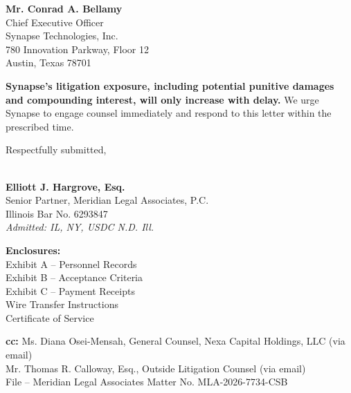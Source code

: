 \documentclass[
  paper=letter,
  fontsize=10.5pt,
  parskip=half,
  firsthead=true,
  fromalign=right,
  fromrule=false,
  addrfield=topaligned,
  subject=titled,
  foldmarks=false
]{scrlttr2}
\newcommand{\iconitem}[2]{%
  \noindent\makebox[1.4em][c]{{\color{GoldAccent}#1}}\hspace{0.4em}#2%
}
\begin{document}
\begin{letter}{%
  \textbf{Mr. Conrad A. Bellamy}\\
  Chief Executive Officer\\
  Synapse Technologies, Inc.\\
  780 Innovation Parkway, Floor 12\\
  Austin, Texas 78701%
}
\begin{tcolorbox}[alertstyle={NOTICE OF LITIGATION INTENT}]
\vspace{4pt}
\noindent\textbf{Synapse's litigation exposure, including potential punitive damages and compounding interest, will only increase with delay.} We urge Synapse to engage counsel immediately and respond to this letter within the prescribed time.
\end{tcolorbox}

\vspace{6pt}

\closing{Respectfully submitted,}

\vspace{2pt}

\par\noindent
\begin{minipage}[t]{0.55\linewidth}
\vspace{10pt}
\noindent{\color{SlateGray}\hdashrule{\linewidth}{0.6pt}{2pt}}\\
\textbf{Elliott J. Hargrove, Esq.}\\
Senior Partner, Meridian Legal Associates, P.C.\\
Illinois Bar No. 6293847\\
\textit{Admitted: IL, NY, USDC N.D. Ill.}
\end{minipage}%
\hfill%
\begin{minipage}[t]{0.38\linewidth}
\begin{tcolorbox}[trackingstyle, top=4pt, bottom=4pt]
  \sffamily\fontsize{7.5}{10}\selectfont
  \textbf{\color{NavyDeep}Enclosures:}\\[2pt]
  \iconitem{\faFile}{Exhibit A -- Personnel Records}\\
  \iconitem{\faFile}{Exhibit B -- Acceptance Criteria}\\
  \iconitem{\faFile}{Exhibit C -- Payment Receipts}\\
  \iconitem{\faFile}{Wire Transfer Instructions}\\
  \iconitem{\faFile}{Certificate of Service}
\end{tcolorbox}
\end{minipage}

\vspace{8pt}
\par\noindent
{\small\color{SlateGray}%
  \textbf{cc:} Ms. Diana Osei-Mensah, General Counsel, Nexa Capital Holdings, LLC (via email)\\
  Mr. Thomas R. Calloway, Esq., Outside Litigation Counsel (via email)\\
  File -- Meridian Legal Associates Matter No. MLA-2026-7734-CSB%
}


\end{letter}
\end{document}
